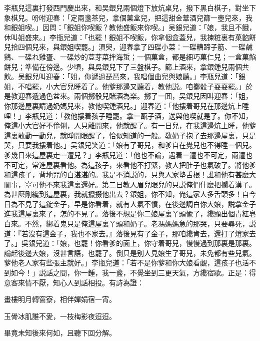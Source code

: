 李瓶兒這裏打發西門慶出來，和吴銀兒兩個燈下放炕桌兒，撥下黑白棋子，對坐下象棋兒。吩咐迎春：「定兩盞茶兒，拿個菓盒兒，把這甜金華酒兒篩一壺兒來，我和銀姐喫。」因問：「銀姐你喫飯？教他盛飯來你喫。」吴銀兒道：「娘，我且不餓，休叫姐盛來。」李瓶兒道：「也罷！銀姐不喫飯，你拿個盒蓋兒，我揀粧裏有菓餡餅兒拾四個兒來，與銀姐喫罷。」湏臾，迎春拿了四碟小菜：一碟糟蹄子筋、一碟鹹鷄、一碟れ雞疍、一碟炒的荳芽菜拌海蜇；一個菓盒，都是細巧菓仁兒；一盒菓餡餅兒；準備在傍邊。少頃，與吳銀兒下了三盤棋子。篩上酒來，拿銀鍾兒兩個共飲。吴銀兒叫迎春：「姐，你遞過琵琶來，我唱個曲兒與娘聽。」李瓶兒道：「銀姐，不唱罷，小大官兒睡着了。他爹那邊又聽着，教他説。咱擲骰子耍耍罷。」於是教迎春遞過色盆來。兩個擲骰兒賭酒為楽。擲了一囬，吴銀兒因叫迎春：「姐，你那邊屋裏請過奶媽兒來，教他喫鍾酒兒。」迎春道：「他摟着哥兒在那邊炕上睡哩！」李瓶兒道：「教他摟着孩子睡罷。拿一甌子酒，送與他喫就是了。你不知，俺這小大官好不伶俐，人只離開來，他就醒了。有一日兒，在我這邊炕上睡，他爹這裏敢動一動兒，就睜開眼醒了，恰似知道的一般。敎奶子抱了去那邊屋裏，只是哭，只要我摟着他。」吴銀兒笑道：「娘有了哥兒，和爹自在覺兒也不得睡一個兒。爹幾日來這屋裏走一遭兒？」李瓶兒道：「他也不論，遇着一遭也不可定，兩遭也不可定，常進屋裏看他。為這孩子，來看他不打緊，教人把肚子也氣破了。將他爹和這孩子，背地咒的白湛湛的。我是不消説的，只與人家墊舌根！誰和他有甚麽大閒事，寜可他不來我這裏還好。第二日教人眉兒眼兒的只説俺們什麽把攔着漢子。為甚麽剛纔到這屋裏，我就攛掇他出去？銀姐，你不知，俺這家人多舌頭多！自今日為不見了這錠金子，早是你看着，就有人氣不憤，在後邊調白你大娘，説拿金子進我這屋裏來了，怎的不見了。落後不想是你二娘屋裏丫頭偸了，纔顯出個青紅皂白來。不然，綁着鬼只是俺這屋裏丫頭和奶子。老馮媽媽急的那哭，只要尋死，説道：『若沒有這金子，我也不家去。』落後見有了金子，那咱纔肯去，還打了燈家去了。」吳銀兒道：「娘，也罷！你看爹的面上，你守着哥兒，慢慢過到那裏是那裏。論起後邊大娘，沒甚言語，也罷了。倒只是别人見娘生了哥兒，未免都有些兒氣。爹他老人家有些張主就好。」李瓶兒道：「若不是你爹和你大娘看覷，這孩子也活不到如今！」説話之間，你一鍾，我一盞，不覺坐到三更天氣，方纔宿歇。正是：得意客來情不厭，知心人到話相投。有詩為證：

\begin{myquote}
畫樓明月轉窗寮，相伴嬋娟宿一宵。

玉骨冰肌誰不愛，一枝梅影夜迢迢。
\end{myquote}

畢竟未知後來何如，且聽下回分解。


